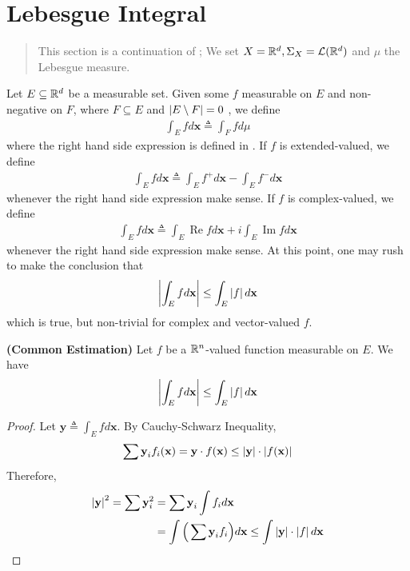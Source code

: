 \documentclass{report}
\begin{document}
\section{Lebesgue Integral}
\begin{abstract}
  This section is a continuation of ; We set $X=\mathbb{R}^d,\Sigma_X=\mathcal{L}(\mathbb{R}^d)$ and $\mu$ the Lebesgue measure.  
\end{abstract}
\begin{mdframed}
Let $E\subseteq \mathbb{R}^d$ be a measurable set. Given some $f$ measurable on $E$ and non-negative on  $F$, where  $F \subseteq E$ and $\left|E\setminus F\right|=0$ , we define 
\begin{align*}
\int_E fd\textbf{x}\triangleq \int_F fd\mu 
\end{align*}
where the right hand side expression is defined in . If $f$ is extended-valued, we define 
\begin{align*}
\int_E fd\textbf{x}\triangleq  \int_E f^+ d\textbf{x}- \int_E f^-d\textbf{x}
\end{align*}
whenever the right hand side expression make sense. If $f$ is complex-valued, we define 
\begin{align*}
\int_E fd\textbf{x}\triangleq \int_E \operatorname{Re}fd\textbf{x} + i \int_E \operatorname{Im}fd\textbf{x}
\end{align*}
whenever the right hand side expression make sense. At this point, one may rush to make the conclusion that 
\begin{align*}
  \left|\int_E fd\textbf{x}\right|\leq \int_E \left|f\right|d\textbf{x}
\end{align*}
which is true, but non-trivial for complex and vector-valued $f$. 
\end{mdframed}
\begin{theorem}
\textbf{(Common Estimation)} Let $f$ be a $\mathbb{R}^n$-valued function measurable on  $E$. We have 
\begin{align*}
  \left|\int_E fd\textbf{x}\right| \leq \int_E \left|f\right|d\textbf{x}
\end{align*}
\end{theorem}
\begin{proof}
Let $\textbf{y}\triangleq \int_E fd\textbf{x}$. By Cauchy-Schwarz Inequality, 
\begin{align*}
\sum \textbf{y}_i f_i(\textbf{x})=\textbf{y}\cdot f(\textbf{x})\leq \left|\textbf{y}\right|\cdot \left|f(\textbf{x})\right|
\end{align*}
Therefore,  
\begin{align*}
\left|\textbf{y}\right|^2 = \sum  \textbf{y}_i^2 &= \sum  \textbf{y}_i \int  f_id\textbf{x}\\
&=\int \Big(\sum  \textbf{y}_i f_i \Big) d\textbf{x} \leq  \int \left|\textbf{y}\right| \cdot \left|f\right|d\textbf{x}
\end{align*}
\end{proof}
\end{document}
